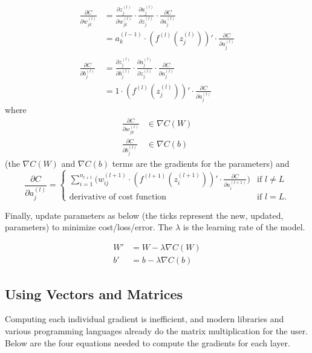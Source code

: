 \documentclass[12pt]{article}
\begin{document}
\begin{align*}
    \frac{\partial C}{\partial w^{(l)}_{jk}}  &= \frac{\partial z^{(l)}_j}{\partial w^{(l)}_{jk}} \cdot \frac{\partial a^{(l)}_j}{\partial z^{(l)}_j} \cdot \frac{\partial C}{\partial a^{(l)}_j} \\
    &= a^{(l-1)}_k \cdot (f^{(l)}(z^{(l)}_j))' \cdot \frac{\partial C}{\partial a^{(l)}_j} \\
    \\
    \frac{\partial C}{\partial b^{(l)}_{j}}  &= \frac{\partial z^{(l)}_j}{\partial b^{(l)}_{j}} \cdot \frac{\partial a^{(l)}_j}{\partial z^{(l)}_j} \cdot \frac{\partial C}{\partial a^{(l)}_j} \\
    &= 1 \cdot (f^{(l)}(z^{(l)}_j))' \cdot \frac{\partial C}{\partial a^{(l)}_j}
\end{align*}
where
\begin{align*}
    \frac{\partial C}{\partial w^{(l)}_{jk}} & \in \nabla C(W) \\
    \frac{\partial C}{\partial b^{(l)}_{j}} & \in \nabla C(b)
\end{align*}
(the $\nabla C(W)$ and $\nabla C(b)$ terms are the gradients for the parameters) and
\begin{equation*}
\frac{\partial C}{\partial a^{(l)}_j} 
    = \begin{cases}
        \sum_{i=1}^{n_{l+1}} \big( w^{(l+1)}_{ij} \cdot (f^{(l+1)}(z^{(l+1)}_i))' \cdot \frac{\partial C}{\partial a^{(l+1)}_i} \big) &\mbox{if } l \neq L \\
        \text{derivative of cost function} &\mbox{if } l = L.
    \end{cases}
\end{equation*}

\noindent
Finally, update parameters as below (the ticks represent the new, updated, parameters) to minimize cost/loss/error. The $\lambda$ is the learning rate of the model.

\begin{align*}
    W' &= W - \lambda \nabla C(W)\\
    b' &= b - \lambda \nabla C(b)
\end{align*}

\newpage
\subsection*{Using Vectors and Matrices}
Computing each individual gradient is inefficient, and modern libraries and various programming languages already do the matrix multiplication for the user. Below are the four equations needed to compute the gradients for each layer.
\end{document}
